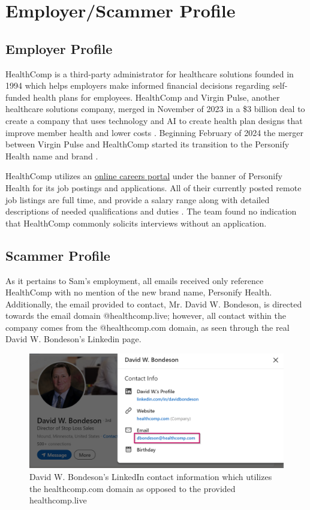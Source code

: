 \section{Employer/Scammer Profile} %
\begin{fullwidth}

\subsection{Employer Profile}
HealthComp is a third-party administrator for healthcare solutions founded in 1994 which helps employers make informed financial decisions regarding self-funded health plans for employees. HealthComp and Virgin Pulse, another healthcare solutions company, merged in November of 2023 in a \$3 billion deal to create a company that uses technology and AI to create health plan designs that improve member health and lower costs \autocite{VirginPulse:2023}. Beginning February of 2024 the merger between Virgin Pulse and HealthComp started its transition to the Personify Health name and brand \autocite{PersonifyHealth:2024}.\\\medskip

HealthComp utilizes an \href{https://careers-virginpulse.icims.com/jobs/intro}{online careers portal} under the banner of Personify Health for its job postings and applications. All of their currently posted remote job listings are full time, and provide a salary range along with detailed descriptions of needed qualifications and duties \autocite{VirginPulse:2024}. The team found no indication that HealthComp commonly solicits interviews without an application.

\subsection{Scammer Profile}
As it pertains to Sam's employment, all emails received only reference HealthComp with no mention of the new brand name, Personify Health. Additionally, the email provided to contact, Mr. David W. Bondeson, is directed towards the email domain @healthcomp.live; however, all contact within the company comes from the @healthcomp.com domain, as seen through the real David W. Bondeson's Linkedin page. \\\medskip

\begin{figure} %
        \label{sec:Fig1}
        \centering
	\includegraphics[width=.75\linewidth]{assets/bondeson-email.png}
        \captionsetup{justification=centering}
	\caption{David W. Bondeson's LinkedIn contact information which utilizes the healthcomp.com domain as opposed to the provided healthcomp.live}
\end{figure}


\end{fullwidth}
